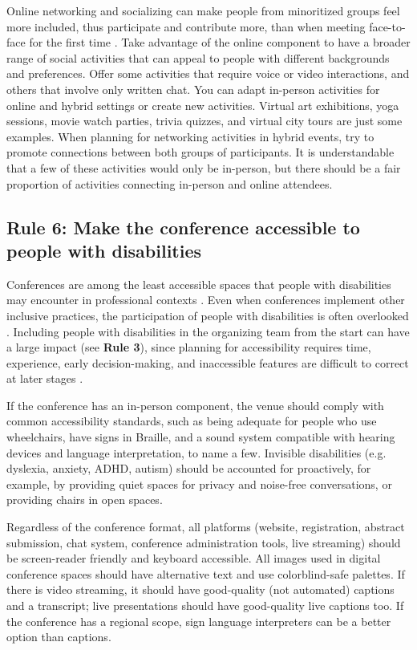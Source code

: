 \documentclass[10pt,letterpaper]{article}
\begin{document}
Online networking and socializing can make people from minoritized groups feel more included, thus participate and contribute more, than when meeting face-to-face for the first time \cite{trianaDoesOrderFacetoFace2012,blackEngenderingBelongingThoughtful2020}.
Take advantage of the online component to have a broader range of social activities that can appeal to people with different backgrounds and preferences.
Offer some activities that require voice or video interactions, and others that involve only written chat.
You can adapt in-person activities for online and hybrid settings or create new activities. 
Virtual art exhibitions, yoga sessions, movie watch parties, trivia quizzes, and virtual city tours are just some examples.
When planning for networking activities in hybrid events, try to
promote connections between both groups of participants.
It is understandable that a few of these activities would only be in-person, but 
there should be a fair proportion of activities connecting in-person and online attendees. 


\subsection*{Rule 6: Make the conference accessible to people with disabilities}
\label{rule_accessibility}

Conferences are among the least accessible spaces that people with disabilities may encounter in professional contexts \cite{priceAccessImaginedConstruction2009}. Even when conferences implement other inclusive practices, the participation of people with disabilities is often overlooked \cite{marks2021meeting}. Including people with disabilities in the organizing team from the start can have a large impact (see \textbf{Rule 3}), since planning for accessibility requires time, experience, early decision-making, and inaccessible features are difficult to correct at later stages \cite{irishIncreasingParticipationUsing2020}. 

If the conference has an in-person component, the venue should comply with common accessibility standards, such as being adequate for people who use wheelchairs, have signs in Braille, and a sound system compatible with hearing devices and language interpretation, to name a few. 
Invisible disabilities  (e.g. dyslexia, anxiety, ADHD, autism) should be accounted for proactively, for example, by providing quiet spaces for privacy and noise-free conversations, or providing chairs in open spaces.

Regardless of the conference format, all platforms (website, registration, abstract submission, chat system, conference administration tools, live streaming) should be screen-reader friendly and keyboard accessible. 
All images used in digital conference spaces should have alternative text and use colorblind-safe palettes.
If there is video streaming, it should have good-quality (not automated) captions and a transcript; live presentations should have good-quality live captions too.
If the conference has a regional scope, sign language interpreters can be a better option than captions.
\end{document}
